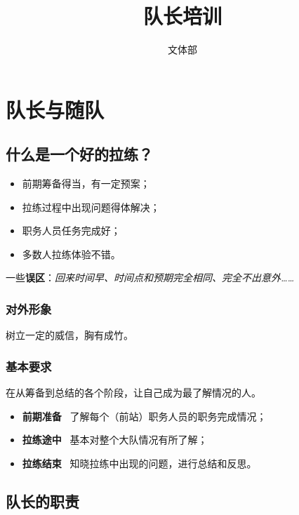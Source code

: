 \documentclass[UTF8]{ctexart}
\title{队长培训}
\author{文体部}
\begin{document}
\maketitle

\tableofcontents

\clearpage

\section{队长与随队}

\subsection{什么是一个好的拉练？}

\begin{itemize}[nosep,left=2em]
    \item 前期筹备得当，有一定预案；
    \item 拉练过程中出现问题得体解决；
    \item 职务人员任务完成好；
    \item 多数人拉练体验不错。
\end{itemize}

一些\textbf{误区}：\textit{回来时间早、时间点和预期完全相同、完全不出意外……}
 

\subsubsection{对外形象}

树立一定的威信，胸有成竹。

\subsubsection{基本要求}

在从筹备到总结的各个阶段，让自己成为最了解情况的人。
\begin{itemize}[nosep,left=2em]
    \item \textbf{前期准备} \ 了解每个（前站）职务人员的职务完成情况；
    \item \textbf{拉练途中} \ 基本对整个大队情况有所了解；
    \item \textbf{拉练结束} \ 知晓拉练中出现的问题，进行总结和反思。
\end{itemize}

\subsection{队长的职责}
\end{document}
